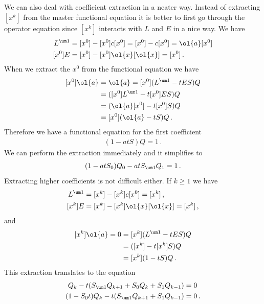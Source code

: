 We can also deal with coefficient extraction in a neater way. Instead of extracting $[x^k]$ from the master functional equation it is better to first go through the operator equation since $[x^k]$ interacts with $L$ and $E$ in a nice way. We have
\begin{align}
	[x^0]L^{\um 1} &= [x^0]-[x^0]c[x^0] = [x^0]-c[x^0] = \ol{a}[x^0]\\
	[x^0]E &= [x^0] - [x^0]\ol{x}[\ol{x}] = [x^0]\,.
\end{align}
When we extract the $x^0$ from the functional equation we have
\begin{align}
\begin{split}
	[x^0]\ol{a} &= \ol{a} = [x^0](L^{\um 1} - tES)Q \\
	&= ([x^0]L^{\um 1} - t[x^0]ES)Q \\
	&= (\ol{a}[x^0]-t[x^0]S)Q\\ 
	&= [x^0](\ol{a}-tS)Q\,.
\end{split}
\end{align}
Therefore we have a functional equation for the first coefficient
\begin{align}
	[x^0](1-atS)Q = 1\,.
\end{align}
We can perform the extraction immediately and it simplifies to
\begin{align}
	(1-atS_0)Q_0-atS_{\um 1}Q_1 = 1\,.
\end{align}
Extracting higher coefficients is not difficult either. If $k \ge 1$ we have
\begin{align}
	[x^k]L^{\um 1} &= [x^k]-[x^k]c[x^0] = [x^k]\,,\\
	[x^k]E &= [x^k] - [x^k]\ol{x}[\ol{x}] = [x^k]\,,
\end{align}
and
\begin{align}
\begin{split}
	[x^k]\ol{a} = 0 &= [x^k](L^{\um 1} - tES)Q \\
	&= ([x^k] - t[x^k]S)Q \\
	&= [x^k](1-tS)Q\,.
\end{split}
\end{align}
This extraction translates to the equation
\begin{align}\begin{split}
	Q_k - t(S_{\um 1}Q_{k+1}+S_0Q_k+S_1 Q_{k-1}) &= 0\\
	 (1-S_0t) Q_k -t(S_{\um 1}Q_{k+1} + S_1 Q_{k-1}) &= 0\,.
\end{split}\end{align}

